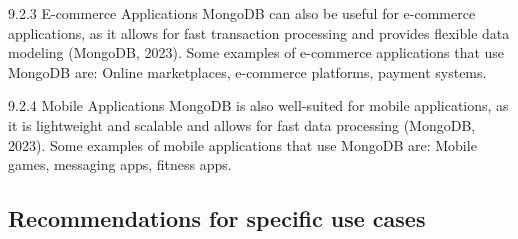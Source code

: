 9.2.3 E-commerce Applications
MongoDB can also be useful for e-commerce applications, as it allows for fast transaction 
processing and provides flexible data modeling (MongoDB, 2023). Some examples of e-commerce 
applications that use MongoDB are:
Online marketplaces, e-commerce platforms, payment systems.

9.2.4 Mobile Applications
MongoDB is also well-suited for mobile applications, as it is lightweight and scalable and allows 
for fast data processing (MongoDB, 2023). Some examples of mobile applications that use MongoDB 
are:
Mobile games, messaging apps, fitness apps.



\subsection{Recommendations for specific use cases}

